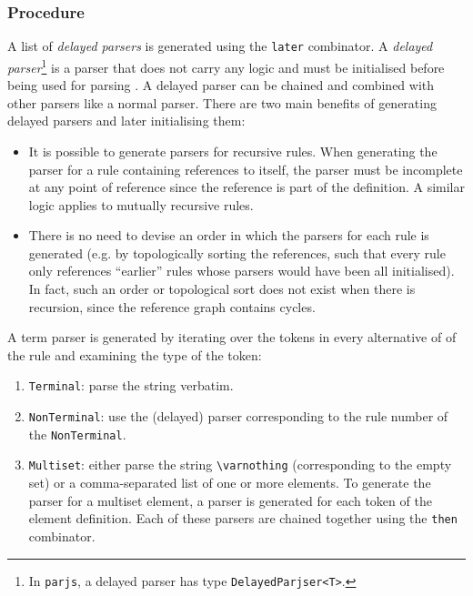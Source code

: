 \subsubsection{Procedure}
\label{term:procedure}
A list of \textit{delayed parsers} is generated using the \lstinline{later} combinator. A \textit{delayed parser}\footnote{In \lstinline{parjs}, a delayed parser has type \lstinline{DelayedParjser<T>}.} is a parser that does not carry any logic and must be initialised before being used for parsing \cite{parjs}. A delayed parser can be chained and combined with other parsers like a normal parser. There are two main benefits of generating delayed parsers and later initialising them:
\begin{itemize}
    \item It is possible to generate parsers for recursive rules. When generating the parser for a rule containing references to itself, the parser must be incomplete at any point of reference since the reference is part of the definition. A similar logic applies to mutually recursive rules.
    \item There is no need to devise an order in which the parsers for each rule is generated (e.g. by topologically sorting the references, such that every rule only references ``earlier'' rules whose parsers would have been all initialised). In fact, such an order or topological sort does not exist when there is recursion, since the reference graph contains cycles.
\end{itemize}
A term parser is generated by iterating over the tokens in every alternative of of the rule and examining the type of the token:
\begin{enumerate}
    \item \lstinline{Terminal}: parse the string verbatim.
    \item \lstinline{NonTerminal}: use the (delayed) parser corresponding to the rule number of the \lstinline{NonTerminal}.
    \item \lstinline{Multiset}: either parse the string \lstinline{\varnothing} (corresponding to the empty set) or a comma-separated list of one or more elements. To generate the parser for a multiset element, a parser is generated for each token of the element definition. Each of these parsers are chained together using the \lstinline{then} combinator.
\end{enumerate}